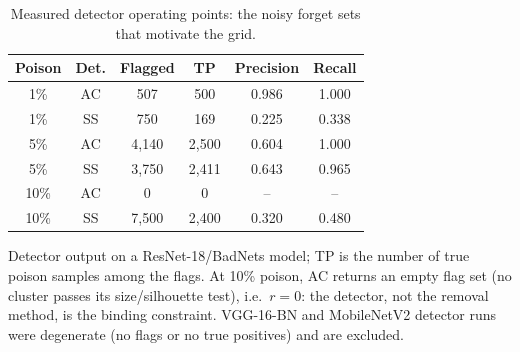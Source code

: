 \begin{table}[t]
\centering
\caption{Measured detector operating points: the noisy forget sets that motivate the grid.}
\label{tab:detector}
\footnotesize
\begin{tabular}{cccccc}
\toprule
\textbf{Poison} & \textbf{Det.} & \textbf{Flagged} & \textbf{TP} & \textbf{Precision} & \textbf{Recall} \\
\midrule
1\% & AC & 507 & 500 & 0.986 & 1.000 \\
1\% & SS & 750 & 169 & 0.225 & 0.338 \\
5\% & AC & 4,140 & 2,500 & 0.604 & 1.000 \\
5\% & SS & 3,750 & 2,411 & 0.643 & 0.965 \\
10\% & AC & 0 & 0 & -- & -- \\
10\% & SS & 7,500 & 2,400 & 0.320 & 0.480 \\
\bottomrule
\end{tabular}
\par\vspace{1pt}\footnotesize\raggedright Detector output on a ResNet-18/BadNets model; TP is the number of true poison samples among the flags. At 10\% poison, AC returns an empty flag set (no cluster passes its size/silhouette test), i.e.\ $r=0$: the detector, not the removal method, is the binding constraint. VGG-16-BN and MobileNetV2 detector runs were degenerate (no flags or no true positives) and are excluded.
\end{table}
